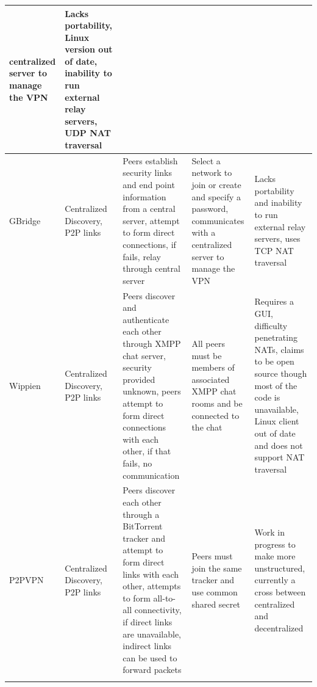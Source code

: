 \begin{center}
{{\begin{longtable}{p{.8in}p{1.25in}p{1.2in}p{1.25in}p{1.25in}}
centralized server to manage the VPN
&
Lacks portability, Linux version out of date, inability to run external relay
servers, UDP NAT traversal
\\ \hline
GBridge
&
Centralized Discovery, P2P links
&
Peers establish security links and end point information from a central
server, attempt to form direct connections, if fails, relay through central
server
&
Select a network to join or create and specify a password, communicates with a
centralized server to manage the VPN
&
Lacks portability and inability to run external relay servers, uses TCP NAT
traversal
\\ \hline
Wippien
&
Centralized Discovery, P2P links
&
Peers discover and authenticate each other through XMPP chat server, security
provided unknown, peers attempt to form direct connections with each other, if
that fails, no communication
&
All peers must be members of associated XMPP chat rooms and be connected to the
chat
&
Requires a GUI, difficulty penetrating NATs, claims to be open source though
most of the code is unavailable, Linux client out of date and does not support
NAT traversal
\\ \hline
P2PVPN
&
Centralized Discovery, P2P links
&
Peers discover each other through a BitTorrent tracker and attempt to form
direct links with each other, attempts to form all-to-all connectivity, if
direct links are unavailable, indirect links can be used to forward packets
&
Peers must join the same tracker and use common shared secret
&
Work in progress to make more unstructured, currently a cross between
centralized and decentralized
\\ \hline
\label{tab:virtual_networks}
\end{longtable} } }
\end{center}
